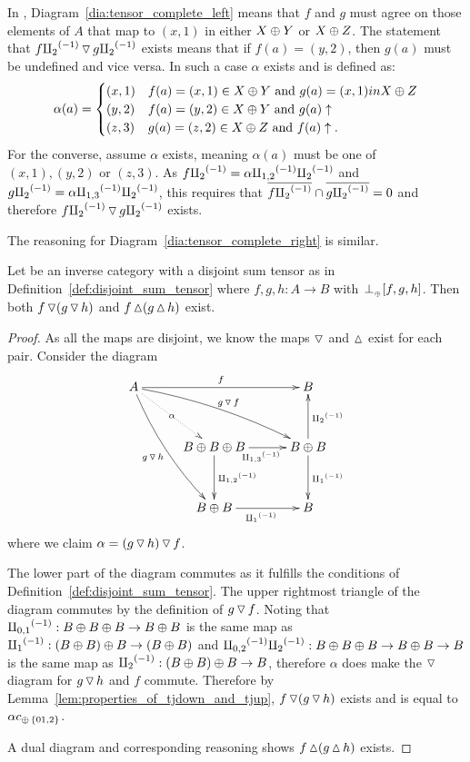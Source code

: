 \begin{example}\label{ex:pinj_has_disjoint_sum_tensor}
  In \pinj, Diagram~\ref{dia:tensor_complete_left} means that $f$ and $g$ must agree on those
  elements of $A$ that map to $(x,1)$ in either $X\oplus Y$ or $X\oplus Z$. The statement that
  $f {\amalg_{2}}^{(-1)}  \operatorname{\triangledown} g {\amalg_{2}}^{(-1)}$ exists means that if $f(a) = (y,2)$, then $g(a)$ must be undefined and
  vice versa. In such a case $\alpha$ exists and is defined as:
  \[
     \alpha(a) = \begin{cases}
       (x,1) & f(a) = (x,1)\in X\oplus Y \text{ and }g(a) = (x,1) in X\oplus Z\\
       (y,2) & f(a) = (y,2)\in X\oplus Y \text{ and }g(a) \uparrow\\
       (z,3) & g(a) = (z,2)\in X\oplus Z \text{ and }f(a) \uparrow.
       \end{cases}
 \]
 For the converse, assume $\alpha$ exists, meaning $\alpha(a)$ must be one of $(x,1), (y,2)$ or $(z,3)$. As
 $f{\amalg_{2}}^{(-1)} = \alpha{\amalg_{1,2}}^{(-1)}{\amalg_{2}}^{(-1)}$ and $g{\amalg_{2}}^{(-1)} = \alpha{\amalg_{1,3}}^{(-1)}{\amalg_{2}}^{(-1)}$, this
 requires that $\overline{f{\amalg_{2}}^{(-1)}}\cap\overline{g{\amalg_{2}}^{(-1)}} =0$ and therefore $f {\amalg_{2}}^{(-1)}  \operatorname{\triangledown} g {\amalg_{2}}^{(-1)}$ exists.

 The reasoning for Diagram~\ref{dia:tensor_complete_right} is similar.
\end{example}
\begin{lemma}\label{lem:complete_disjointness_means_multiple_disjoints}
  Let \X be an inverse category with a disjoint sum tensor as in
  Definition~\ref{def:disjoint_sum_tensor} where $f,g,h:A\to B$ with
  ${}_{{}_{}}{\perp_{{}_{\oplus}}}[f,g,h]$. Then both $f \operatorname{\triangledown} (g \operatorname{\triangledown} h)$ and $f\operatorname{\vartriangle}(g\operatorname{\vartriangle} h)$ exist.
\end{lemma}
\begin{proof}
  As all the maps are disjoint, we know the maps $\operatorname{\triangledown}$ and $\operatorname{\vartriangle}$ exist for each pair.
  Consider the diagram
  \[
    \xymatrix@C+5pt@R+10pt{
      A \ar@/_/[ddr]_{g\tjdown h} \ar@/^/[drr]^{g\tjdown f} \ar@{.>}[dr]|-{\alpha} \ar[rr]^{f}
        & & B \\
        & B\+B\+B \ar[d]^{\icp{1,2}} \ar[r]_{\icp{1,3}} & B\+B \ar[d]^{\icpa} \ar[u]_{\icpb} \\
        & B\+B \ar[r]_{\icpa} & B
    }
  \]
  where we claim $\alpha = (g\operatorname{\triangledown} h)\operatorname{\triangledown} f$.

  The lower part of the diagram commutes as it fulfills the conditions of
  Definition~\ref{def:disjoint_sum_tensor}. The upper rightmost triangle of the diagram commutes by
  the definition of $g\operatorname{\triangledown} f$. Noting that ${\amalg_{0,1}}^{(-1)}:B\oplus B\oplus B \to B\oplus B$ is the same map as
  ${\amalg_{1}}^{(-1)}:(B\oplus B)\oplus B\to (B\oplus B)$ and ${\amalg_{0,2}}^{(-1)} {\amalg_{2}}^{(-1)}:B\oplus B\oplus B \to B\oplus B \to B$ is the same map as
  ${\amalg_{2}}^{(-1)}:(B\oplus B)\oplus B\to B$, therefore $\alpha$ does make the $\operatorname{\triangledown}$ diagram for $g\operatorname{\triangledown} h$ and $f$
  commute. Therefore by Lemma~\ref{lem:properties_of_tjdown_and_tjup}, $f\operatorname{\triangledown}(g\operatorname{\triangledown} h)$
  exists and is equal to $\alpha c_{\oplus\,\{01,2\}}$.

  A dual diagram and corresponding reasoning shows $f\operatorname{\vartriangle}(g\operatorname{\vartriangle} h)$ exists.
\end{proof}

